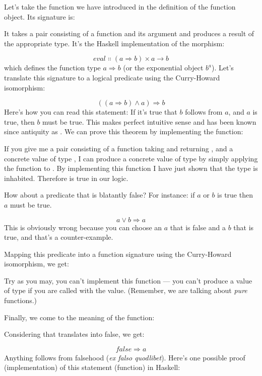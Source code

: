 Let's take the function  we have introduced in the
definition of the function object. Its signature is:

It takes a pair consisting of a function and its argument and produces a
result of the appropriate type. It's the Haskell implementation of the
morphism:

\[\mathit{eval} \Colon (a \Rightarrow b) \times a \to b\]
which defines the function type $a \Rightarrow b$ (or the exponential object
$b^{a}$). Let's translate this signature to a logical predicate
using the Curry-Howard isomorphism:

\[((a \Rightarrow b) \wedge a) \Rightarrow b\]
Here's how you can read this statement: If it's true that $b$
follows from $a$, and $a$ is true, then $b$ must be
true. This makes perfect intuitive sense and has been known since
antiquity as . We can prove this theorem by
implementing the function:

If you give me a pair consisting of a function  taking
 and returning , and a concrete value  of
type , I can produce a concrete value of type  by
simply applying the function  to . By implementing
this function I have just shown that the type
 is inhabited.
Therefore  is true in our logic.

How about a predicate that is blatantly false? For instance: if
$a$ or $b$ is true then $a$ must be true.

\[a \vee b \Rightarrow a\]
This is obviously wrong because you can choose an $a$ that is
false and a $b$ that is true, and that's a counter-example.

Mapping this predicate into a function signature using the Curry-Howard
isomorphism, we get:

Try as you may, you can't implement this function --- you can't produce
a value of type  if you are called with the 
value. (Remember, we are talking about \emph{pure} functions.)

Finally, we come to the meaning of the  function:

Considering that  translates into false, we get:

\[\mathit{false} \Rightarrow a\]
Anything follows from falsehood (\emph{ex falso quodlibet}). Here's one
possible proof (implementation) of this statement (function) in Haskell:

